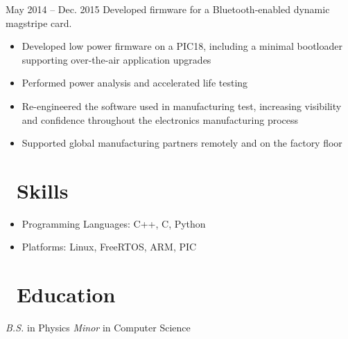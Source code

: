 \documentclass{resume}
\begin{document}
          {May 2014 -- Dec. 2015}
Developed firmware for a Bluetooth-enabled dynamic magstripe card.
\begin{itemize}
  \item Developed low power firmware on a PIC18, including
      a minimal bootloader supporting over-the-air application upgrades
  \item Performed power analysis and accelerated life testing
  \item Re-engineered the software used in manufacturing test, increasing visibility
        and confidence throughout the electronics manufacturing process
  \item Supported global manufacturing partners remotely and on the factory floor
\end{itemize}
\vspace{3mm}

\section{\faCogs\ Skills}
\begin{itemize}[parsep=0.5ex]
  \item Programming Languages: C++, C, Python
  \item Platforms: Linux, FreeRTOS, ARM, PIC
\end{itemize}

\section{\faGraduationCap\ Education}
\textit{B.S.} in Physics
\newline
\textit{Minor} in Computer Science
\end{document}
